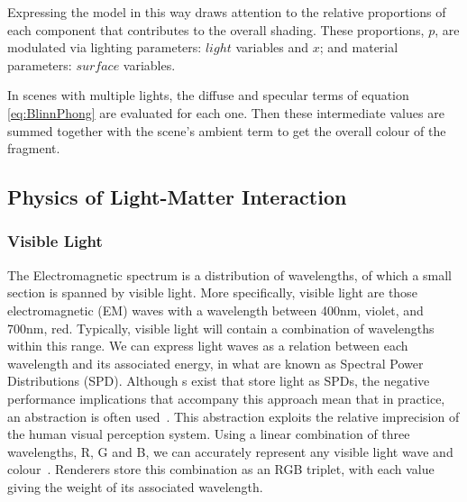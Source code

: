 Expressing the model in this way draws attention to the relative proportions of each component that contributes to the overall shading. These proportions, \begin{math}p\end{math}, are modulated via lighting parameters:  \begin{math}light\end{math} variables and \begin{math}x\end{math}; and material parameters: \begin{math}surface\end{math} variables.

In scenes with multiple lights, the diffuse and specular terms of equation \ref{eq:BlinnPhong} are evaluated for each one. Then these intermediate values are summed together with the scene's ambient term to get the overall colour of the fragment.

\subsection{Physics of Light-Matter Interaction} \label{PhysicsOfLightMatterInteraction}

\subsubsection{Visible Light}

The Electromagnetic spectrum is a distribution of wavelengths, of which a small section is spanned by visible light. More specifically, visible light are those electromagnetic (EM) waves with a wavelength between 400nm, violet, and 700nm, red. Typically, visible light will contain a combination of wavelengths within this range. We can express light waves as a relation between each wavelength and its associated energy, in what are known as Spectral Power Distributions (SPD). Although s exist that store light as SPDs, the negative performance implications that accompany this approach mean that in practice, an abstraction is often used~\cite{SpectralRendering}. This abstraction exploits the relative imprecision of the human visual perception system. Using a linear combination of three wavelengths, R, G and B, we can accurately represent any visible light wave and colour~\cite{RGBColours}. Renderers store this combination as an RGB triplet, with each value giving the weight of its associated wavelength.

